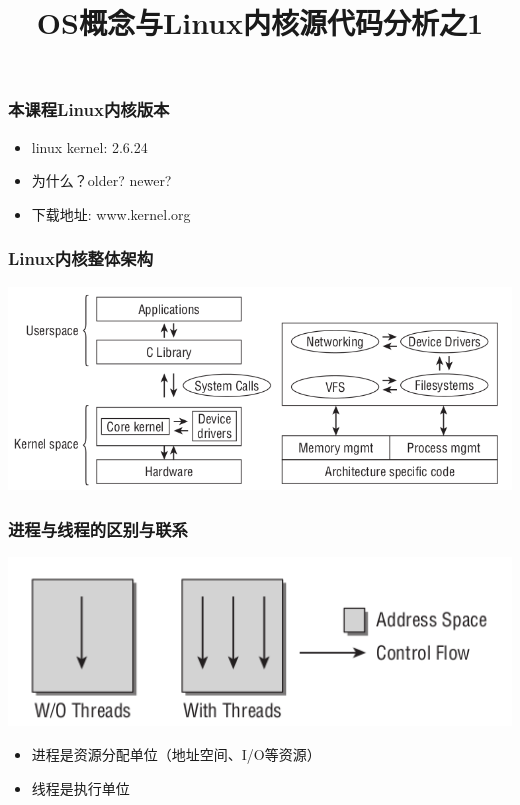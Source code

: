 \documentclass[xcolor=svgnames]{beamer}
\begin{document}
\begin{CJK*}{UTF8}{gbsn}


\title{OS概念与Linux内核源代码分析之1}

\begin{frame}
\maketitle
\end{frame}

\begin{frame}[fragile]%
\frametitle{本课程Linux内核版本}
\begin{itemize}
\item linux kernel: 2.6.24 
\item 为什么？older? newer?
\item 下载地址: www.kernel.org
\end{itemize}
\end{frame}

\begin{frame}[fragile]%
\frametitle{Linux内核整体架构}
\includegraphics[width=1.0\textwidth]{kernel.png}
\end{frame}

\begin{frame}[fragile]%
\frametitle{进程与线程的区别与联系}
\includegraphics[width=1.0\textwidth]{proc_thread.png}
\begin{itemize}
\item 进程是资源分配单位（地址空间、I/O等资源）
\item 线程是执行单位
\end{itemize}
\end{frame}


\end{CJK*}
\end{document}
